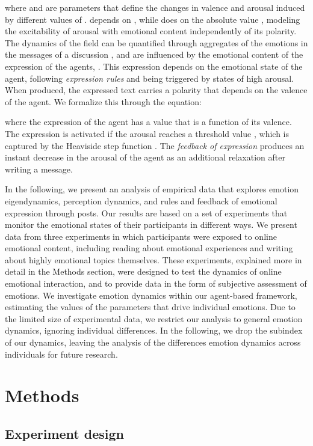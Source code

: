 \documentclass[nologo,url,11pt,a4paper]{ETHpaper}
\begin{document}
where  and  are parameters that define the changes in valence and arousal induced by different values of . 
 depends on , while  does on the absolute value , modeling the excitability of arousal with emotional content independently of its polarity.
The dynamics of the field  can be quantified through aggregates of the emotions in the messages of a discussion \cite{Garas2012,Garcia2011}, and are influenced by the emotional content of the expression of the agents, . 
This expression depends on the emotional state of the agent, following \emph{expression rules} and being triggered by states of high arousal. When produced, the expressed text carries a polarity that depends on the valence of the agent. We formalize this through the equation:

where the expression of the agent has a value that is a function 
of its valence. The expression  is activated  if the arousal reaches
a threshold value , which is captured by the Heaviside step function
.  The \emph{feedback of expression} produces an instant decrease in the arousal of the agent as an additional relaxation after writing a message.

In the following, we present an analysis of empirical data that explores emotion eigendynamics, perception dynamics, and rules and feedback of emotional expression through posts. 
Our results are based on a set of experiments that monitor the emotional states of their
participants in different ways.   
We present data from three experiments in which participants were exposed to online emotional content, including reading about emotional experiences and writing about highly emotional topics themselves. 
These experiments, explained more in detail in the Methods section, were designed to test the dynamics of online emotional interaction, and to provide data in the form of subjective assessment of emotions. 
We investigate emotion dynamics within our agent-based framework, estimating the values of the parameters that drive individual emotions.  
Due to the limited size of experimental data, we restrict our analysis to general emotion dynamics, ignoring individual differences. In the following, we drop the subindex  of our dynamics, leaving the analysis of the differences emotion dynamics across individuals for future research.


\section{Methods}

\subsection{Experiment design}
\end{document}
